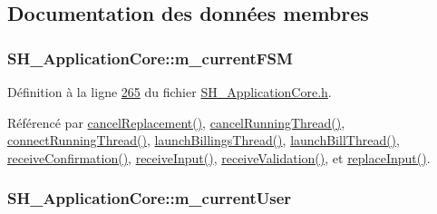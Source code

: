 \subsection{Documentation des données membres}
\hypertarget{classSH__ApplicationCore_a8e550daf4a5d49d88714b716953e4957}{
\subsubsection[{m\-\_\-current\-F\-S\-M}]{\setlength{\rightskip}{0pt plus 5cm}S\-H\-\_\-\-Application\-Core\-::m\-\_\-current\-F\-S\-M\hspace{0.3cm}{\ttfamily [private]}}}\label{classSH__ApplicationCore_a8e550daf4a5d49d88714b716953e4957}


Définition à la ligne \hyperlink{SH__ApplicationCore_8h_source_l00265}{265} du fichier \hyperlink{SH__ApplicationCore_8h_source}{S\-H\-\_\-\-Application\-Core.\-h}.



Référencé par \hyperlink{classSH__ApplicationCore_a9976ff6a371d6fe4c97cc37692584ff1}{cancel\-Replacement()}, \hyperlink{classSH__ApplicationCore_a1877174428cec5165c2c2f317086a9b7}{cancel\-Running\-Thread()}, \hyperlink{classSH__ApplicationCore_a264c6e0c0c2e25a36a2502d1d9bcb109}{connect\-Running\-Thread()}, \hyperlink{classSH__ApplicationCore_aa0777211696005ec89b2effe06190c3b}{launch\-Billings\-Thread()}, \hyperlink{classSH__ApplicationCore_ab72fd6cdc47575d47157fc7bdffae8f2}{launch\-Bill\-Thread()}, \hyperlink{classSH__ApplicationCore_a15cce25dbf982bc8fc391ddfb4d1fd24}{receive\-Confirmation()}, \hyperlink{classSH__ApplicationCore_a2191031eaee203587c1897791ddefbc4}{receive\-Input()}, \hyperlink{classSH__ApplicationCore_a6d40bb4cca2fe9e091dd369518d08ce0}{receive\-Validation()}, et \hyperlink{classSH__ApplicationCore_a82123e26fba2d137cbf356b4aaf2078e}{replace\-Input()}.

\hypertarget{classSH__ApplicationCore_a2bd2432939b96af2a1003630df83da63}{
\subsubsection[{m\-\_\-current\-User}]{\setlength{\rightskip}{0pt plus 5cm}S\-H\-\_\-\-Application\-Core\-::m\-\_\-current\-User\hspace{0.3cm}{\ttfamily [private]}}}\label{classSH__ApplicationCore_a2bd2432939b96af2a1003630df83da63}


